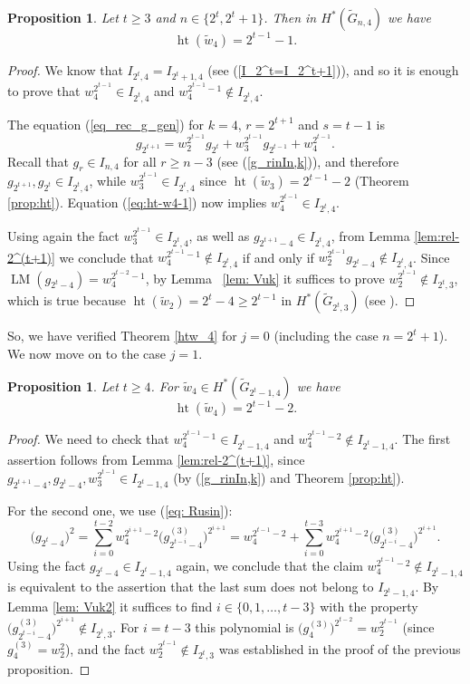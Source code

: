 \documentclass{amsart}
\newtheorem{proposition}[theorem]{Proposition}
\theoremstyle{definition}
\theoremstyle{remark}
\numberwithin{equation}{section}
\newcommand{\gr}{\widetilde G}
\newcommand{\w}{\widetilde w}
\newcommand{\lm}{\operatorname{LM}}
\newcommand{\htt}{\operatorname{ht}}
\renewcommand{\ge}{\geqslant}
\begin{document}
\begin{proposition}\label{prop:ht(w4)}
    Let $t\ge3$ and $n\in\{2^t,2^t+1\}$. Then in $H^*(\gr_{n,4})$ we have 
    \[\htt(\w_4) = 2^{t-1}-1.\]
\end{proposition}
\begin{proof}
We know that $I_{2^t,4}=I_{2^t+1,4}$ (see (\ref{I_2^t=I_2^t+1})), and so it is enough to prove that $w_4^{2^{t-1}}\in I_{2^t,4}$ and $w_4^{2^{t-1}-1}\notin I_{2^t,4}$.

The equation (\ref{eq_rec_g_gen}) for $k=4$, $r=2^{t+1}$ and $s=t-1$ is
\begin{equation}\label{eq:ht-w4-1}
g_{2^{t+1}} = w_2^{2^{t-1}}g_{2^t} + w_3^{2^{t-1}}g_{2^{t-1}} + w_4^{2^{t-1}}.\end{equation}
Recall that $g_r\in I_{n,4}$ for all $r\ge n-3$ (see (\ref{g_rinIn,k})), and therefore
 $g_{2^{t+1}}, g_{2^t}\in I_{2^t,4}$, while $w_3^{2^{t-1}}\in I_{2^t,4}$ since $\htt(\w_3) = 2^{t-1}-2$ (Theorem \ref{prop:ht}). Equation (\ref{eq:ht-w4-1}) now implies $w_4^{2^{t-1}}\in I_{2^t,4}$.

Using again the fact $w_3^{2^{t-1}}\in I_{2^t,4}$, as well as $g_{2^{t+1}-4}\in I_{2^t,4}$, from Lemma \ref{lem:rel-2^(t+1)} we conclude that $w_4^{2^{t-1}-1}\notin I_{2^t,4}$ if and only if $w_2^{2^{t-1}}g_{2^t-4}\notin I_{2^t,4}$. Since $\lm(g_{2^t-4}) = w_4^{2^{t-2}-1}$, by Lemma ~\ref{lem: Vuk} it suffices to prove $w_2^{2^{t-1}}\notin I_{2^t,3}$, which is true because $\htt(\w_2) = 2^t-4\ge2^{t-1}$ in $H^*(\gr_{2^t,3})$ (see \cite[Theorem 1.2]{CP-cl}). 
\end{proof}

So, we have verified Theorem \ref{htw_4} for $j=0$ (including the case $n=2^t+1$). We now move on to the case $j=1$. 

\begin{proposition}\label{prop: ht(w_4)_2^t-1}
    Let $t\ge4$. For $\w_4 \in H^*(\gr_{2^t-1,4})$ we have
    \[\htt(\w_4) = 2^{t-1}-2.\]
\end{proposition}
\begin{proof}
  We need to check that $w_4^{2^{t-1}-1}\in I_{2^t-1,4}$ and $w_4^{2^{t-1}-2}\notin I_{2^t-1,4}$. The first assertion follows from Lemma \ref{lem:rel-2^(t+1)}, since $g_{2^{t+1}-4},g_{2^t-4},w_3^{2^{t-1}}\in I_{2^t-1,4}$ (by (\ref{g_rinIn,k}) and Theorem \ref{prop:ht}).

  For the second one, we use (\ref{eq: Rusin}):
  \[\big(g_{2^t-4}\big)^2=\sum_{i= 0}^{t-2}w_4^{2^{i+1}-2}\big(g_{2^{t-i}-4}^{(3)}\big)^{2^{i+1}}=w_4^{2^{t-1}-2}+\sum_{i= 0}^{t-3}w_4^{2^{i+1}-2}\big(g_{2^{t-i}-4}^{(3)}\big)^{2^{i+1}}.\]
  Using the fact $g_{2^t-4}\in I_{2^t-1,4}$ again, we conclude that the claim $w_4^{2^{t-1}-2}\notin I_{2^t-1,4}$ is equivalent to the assertion that the last sum does not belong to $I_{2^t-1,4}$. By Lemma \ref{lem: Vuk2} it suffices to find $i\in\{0,1,\ldots,t-3\}$ with the property $\big(g_{2^{t-i}-4}^{(3)}\big)^{2^{i+1}}\notin I_{2^t,3}$. For $i=t-3$ this polynomial is $\big(g_4^{(3)}\big)^{2^{t-2}}=w_2^{2^{t-1}}$ (since $g_4^{(3)}=w_2^2$), and the fact $w_2^{2^{t-1}}\notin I_{2^t,3}$ was established in the proof of the previous proposition.
\end{proof}
  
\end{document}
